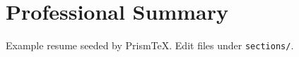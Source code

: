 \section*{Professional Summary}
Example resume seeded by PrismTeX. Edit files under \texttt{sections/}.

